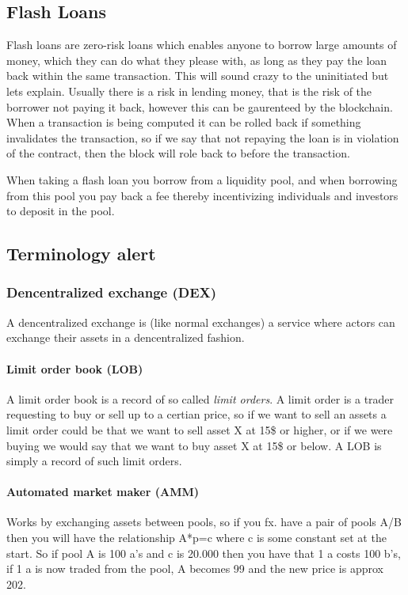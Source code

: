 \subsection{Flash Loans}
Flash loans are zero-risk loans which enables anyone to borrow large amounts of money, which they can do what they please with, as long as they pay the loan back within the same transaction. This will sound crazy to the uninitiated but lets explain. Usually there is a risk in lending money, that is the risk of the borrower not paying it back, however this can be gaurenteed by the blockchain. When a transaction is being computed it can be rolled back if something invalidates the transaction, so if we say that not repaying the loan is in violation of the contract, then the block will role back to before the transaction.

When taking a flash loan you borrow from a liquidity pool, and when borrowing from this pool you pay back a fee thereby incentivizing individuals and investors to deposit in the pool.

\subsection{Terminology alert}
\subsubsection{Dencentralized exchange (DEX)}
A dencentralized exchange is (like normal exchanges) a service where actors can exchange their assets in a dencentralized fashion.

\paragraph{Limit order book (LOB)}
A limit order book is a record of so called \textit{limit orders}. A limit order is a trader requesting to buy or sell up to a certian price, so if we want to sell an assets a limit order could be that we want to sell asset X at 15\$ or higher, or if we were buying we would say that we want to buy asset X at 15\$ or below. A LOB is simply a record of such limit orders.

\paragraph{Automated market maker (AMM)}
Works by exchanging assets between pools, so if you fx. have a pair of pools A/B then you will have the relationship A*p=c where c is some constant set at the start. So if pool A is 100 a’s and c is 20.000 then you have that 1 a costs 100 b’s, if 1 a is now traded from the pool, A becomes 99 and the new price is approx 202.